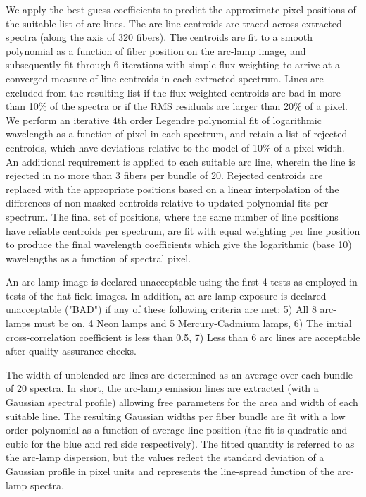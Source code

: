 We apply the best guess coefficients to predict the approximate pixel 
positions of the suitable list of arc lines.  The arc line centroids
are traced across extracted spectra (along the axis of 320 fibers).
The centroids are fit to a smooth polynomial as a function of fiber
position on the arc-lamp image, and subsequently fit through 6 iterations
with simple flux weighting to arrive at a converged measure of line 
centroids in each extracted spectrum.  Lines are excluded from the resulting
list if the flux-weighted centroids are bad in more than 10\% of the
spectra or if the RMS residuals are larger than 20\% of a pixel.
We perform an iterative 4th order Legendre polynomial fit of 
logarithmic wavelength as a function of pixel in each spectrum, 
and retain a list of rejected centroids, 
which have deviations relative to the model of
10\% of a pixel width.  An additional requirement is applied to each
suitable arc line, wherein the line is rejected in no more than 3 fibers
per bundle of 20.  Rejected centroids are replaced with the appropriate
positions based on a linear interpolation of the differences of non-masked
centroids relative to updated polynomial fits per spectrum.
The final set of positions, where the same number of line positions have
reliable centroids per spectrum, are fit with equal weighting per line
position to produce the final wavelength
coefficients which give the logarithmic (base 10) wavelengths as a function
of spectral pixel.

An arc-lamp image is declared unacceptable using the first 4 tests as employed
in tests of the flat-field images.  In addition, an arc-lamp exposure
is declared unacceptable ("BAD") if any of these following criteria are met:
5) All 8 arc-lamps must be on, 4 Neon lamps and 5 Mercury-Cadmium lamps,
6) The initial cross-correlation coefficient is less than 0.5,
7) Less than 6 arc lines are acceptable after quality assurance checks.

The width of unblended arc lines are determined as an average over
each bundle of 20 spectra.  In short, the arc-lamp emission lines 
are extracted (with a Gaussian spectral profile) 
allowing free parameters for the area and width of each suitable line.
The resulting Gaussian widths per fiber bundle are fit 
with a low order polynomial as a function of average line position
(the fit is quadratic and cubic for the blue and red side respectively).
The fitted quantity is referred to as the arc-lamp dispersion,
but the values reflect the standard deviation of a Gaussian 
profile in pixel units and represents the line-spread function of the 
arc-lamp spectra.

